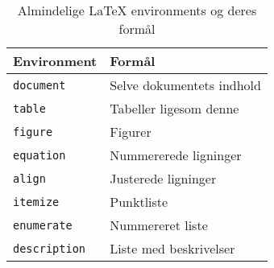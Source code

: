 

\begin{table}[htbp]
  \centering
  \begin{tabular}{ll}
    \toprule
    \textbf{Environment} & \textbf{Formål} \\
    \midrule
    \texttt{document} & Selve dokumentets indhold \\
    \texttt{table} & Tabeller ligesom denne \\
    \texttt{figure} & Figurer \\
    \texttt{equation} & Nummererede ligninger \\
    \texttt{align} & Justerede ligninger \\
    \texttt{itemize} & Punktliste \\
    \texttt{enumerate} & Nummereret liste \\
    \texttt{description} & Liste med beskrivelser \\
    \bottomrule
  \end{tabular}
  \caption{Almindelige \LaTeX{} environments og deres formål}
  \label{tab:my-table}
\end{table}

